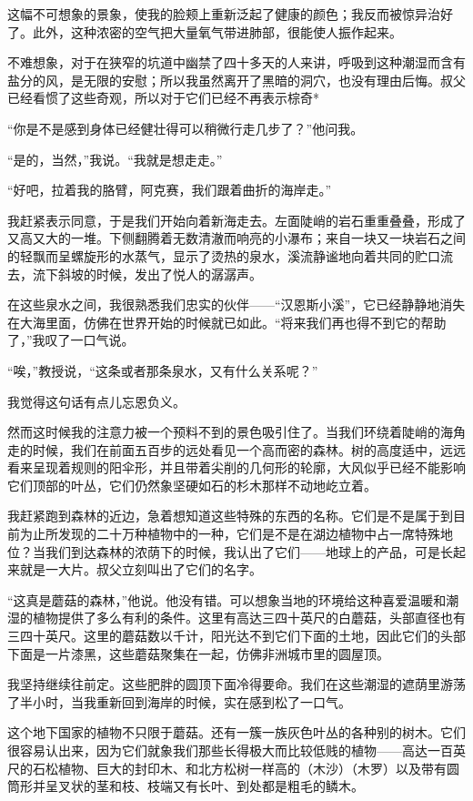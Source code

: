\documentclass[10pt]{book}
\begin{document}
这幅不可想象的景象，使我的脸颊上重新泛起了健康的颜色；我反而被惊异治好了。此外，这种浓密的空气把大量氧气带进肺部，很能使人振作起来。

不难想象，对于在狭窄的坑道中幽禁了四十多天的人来讲，呼吸到这种潮湿而含有盐分的风，是无限的安慰；所以我虽然离开了黑暗的洞穴，也没有理由后悔。叔父已经看惯了这些奇观，所以对于它们已经不再表示棕奇*

“你是不是感到身体已经健壮得可以稍微行走几步了？”他问我。

“是的，当然，”我说。“我就是想走走。”

“好吧，拉着我的胳臂，阿克赛，我们跟着曲折的海岸走。”

我赶紧表示同意，于是我们开始向着新海走去。左面陡峭的岩石重重叠叠，形成了又高又大的一堆。下侧翻腾着无数清澈而响亮的小瀑布；来自一块又一块岩石之间的轻飘而呈螺旋形的水蒸气，显示了烫热的泉水，溪流静谧地向着共同的贮口流去，流下斜坡的时候，发出了悦人的潺潺声。

在这些泉水之间，我很熟悉我们忠实的伙伴——“汉恩斯小溪”，它已经静静地消失在大海里面，仿佛在世界开始的时候就已如此。“将来我们再也得不到它的帮助了，”我叹了一口气说。

“唉，”教授说，“这条或者那条泉水，又有什么关系呢？”

我觉得这句话有点儿忘恩负义。

然而这时候我的注意力被一个预料不到的景色吸引住了。当我们环绕着陡峭的海角走的时候，我们在前面五百步的远处看见一个高而密的森林。树的高度适中，远远看来呈现着规则的阳伞形，并且带着尖削的几何形的轮廓，大风似乎已经不能影响它们顶部的叶丛，它们仍然象坚硬如石的杉木那样不动地屹立着。

我赶紧跑到森林的近边，急着想知道这些特殊的东西的名称。它们是不是属于到目前为止所发现的二十万种植物中的一种，它们是不是在湖边植物中占一席特殊地位？当我们到达森林的浓荫下的时候，我认出了它们——地球上的产品，可是长起来就是一大片。叔父立刻叫出了它们的名字。

“这真是蘑菇的森林，”他说。他没有错。可以想象当地的环境给这种喜爱温暖和潮湿的植物提供了多么有利的条件。这里有高达三四十英尺的白蘑菇，头部直径也有三四十英尺。这里的蘑菇数以千计，阳光达不到它们下面的土地，因此它们的头部下面是一片漆黑，这些蘑菇聚集在一起，仿佛非洲城市里的圆屋顶。

我坚持继续往前定。这些肥胖的圆顶下面冷得要命。我们在这些潮湿的遮荫里游荡了半小时，当我重新回到海岸的时候，实在感到松了一口气。

这个地下国家的植物不只限于蘑菇。还有一簇一族灰色叶丛的各种别的树木。它们很容易认出来，因为它们就象我们那些长得极大而比较低贱的植物——高达一百英尺的石松植物、巨大的封印木、和北方松树一样高的（木沙）（木罗）以及带有圆筒形并呈叉状的茎和枝、枝端又有长叶、到处都是粗毛的鳞木。
\end{document}
